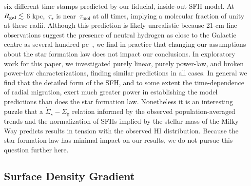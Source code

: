 \documentclass[draft2.tex]{subfiles}
\begin{document}
six different time stamps predicted by our fiducial, inside-out SFH model. 
At~$R_\text{gal} \lesssim$ 6 kpc,~$\tau_\star$ is near~$\tau_\text{mol}$ at all 
times, implying a molecular fraction of unity at these radii. 
Although this prediction is likely unrealistic because 21-cm line observations 
suggest the presence of neutral hydrogen as close to the Galactic centre as 
several hundred pc~\citep{Kalberla2009}, we find in practice that changing our 
assumptions about the star formation law does not impact our conclusions. 
In exploratory work for this paper, we investigated purely linear, purely 
power-law, and broken power-law characterizations, finding similar predictions 
in all cases. 
In general we find that the detailed form of the SFH, and to some extent the 
time-dependence of radial migration, exert much greater power in establishing 
the model predictions than does the star formation law. 
Nonetheless it is an interesting puzzle that a 
$\dot{\Sigma}_\star - \Sigma_\text{g}$ relation informed by the observed 
population-averaged trends and the normalization of SFHs implied by the stellar 
mass of the Milky Way predicts results in tension with the observed HI 
distribution. 
Because the star formation law has minimal impact on our results, we do not 
pursue this question further here. 

\subsection{Surface Density Gradient} 
\label{sec:methods:surface_density_gradient} 
\end{document}
